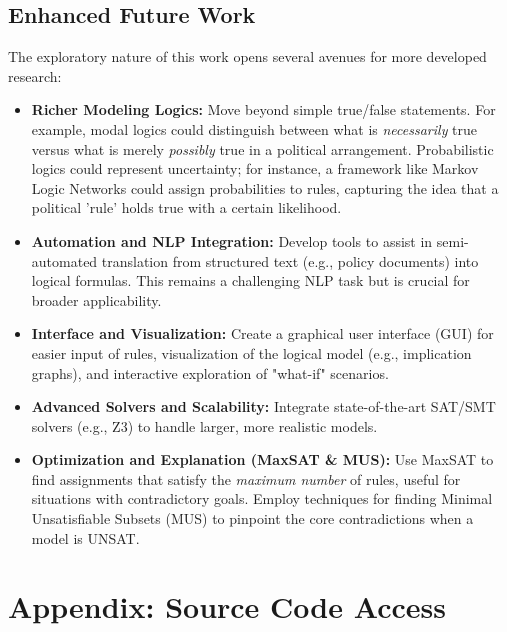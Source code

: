 \documentclass[11pt, a4paper]{article}
\begin{document}
\subsection*{Enhanced Future Work}
The exploratory nature of this work opens several avenues for more developed research:
\begin{itemize}
    \item \textbf{Richer Modeling Logics:} Move beyond simple true/false statements. For example, modal logics could distinguish between what is \textit{necessarily} true versus what is merely \textit{possibly} true in a political arrangement. Probabilistic logics could represent uncertainty; for instance, a framework like Markov Logic Networks \cite{Richardson2006} could assign probabilities to rules, capturing the idea that a political 'rule' holds true with a certain likelihood.

    \medskip
    \item \textbf{Automation and NLP Integration:} Develop tools to assist in semi-automated translation from structured text (e.g., policy documents) into logical formulas. This remains a challenging NLP task but is crucial for broader applicability.

    \medskip
    \item \textbf{Interface and Visualization:} Create a graphical user interface (GUI) for easier input of rules, visualization of the logical model (e.g., implication graphs), and interactive exploration of "what-if" scenarios.

    \medskip
    \item \textbf{Advanced Solvers and Scalability:} Integrate state-of-the-art SAT/SMT solvers (e.g., Z3) to handle larger, more realistic models.

    \medskip
    \item \textbf{Optimization and Explanation (MaxSAT \& MUS):} Use MaxSAT to find assignments that satisfy the \textit{maximum number} of rules, useful for situations with contradictory goals. Employ techniques for finding Minimal Unsatisfiable Subsets (MUS) to pinpoint the core contradictions when a model is UNSAT.
\end{itemize}

\nocite{*}
\printbibliography

\appendix
\section{Appendix: Source Code Access} \label{app:sourcecode_access}
\end{document}
